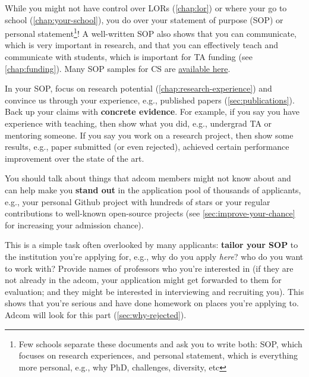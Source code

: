 \documentclass[oneside,11pt,dvipsnames]{book}
\begin{document}
While you might not have control over LORs (\autoref{chap:lor}) or where your go to school (\autoref{chap:your-school}), you do over your
statement of purpose (SOP) or personal statement\footnote{Few schools separate these documents and ask you to write both: SOP, which focuses on research experiences, and personal statement, which is everything more personal, e.g., why PhD, challenges, diversity, etc}! A well-written SOP also shows that you can communicate, which is very important in research, and that you can effectively teach and communicate with students, which is important for TA funding (see \autoref{chap:funding}).  Many SOP samples for CS are \href{https://cs-sop.org/}{available here}.  


In your SOP, focus on research potential (\autoref{chap:research-experience}) and convince us through your experience, e.g., published papers (\autoref{sec:publications}). Back up your claims with \textbf{concrete evidence}. For example, if you say you have experience with teaching, then show what you did, e.g., undergrad TA or mentoring someone.  If you say you work on a research project, then show some results, e.g., paper submitted (or even rejected), achieved certain performance improvement over the state of the art. 


You should talk about things that adcom members might not know about and can help make you \textbf{stand out} in the application pool of thousands of applicants, e.g., your personal Github project with hundreds of stars or your regular contributions to well-known open-source projects (see \autoref{sec:improve-your-chance} for increasing your admission chance).


This is a simple task often overlooked by many applicants: \textbf{tailor your SOP} to the institution you're applying for,
e.g., why do you apply \emph{here}? who do you want to work with?
Provide names of professors who you're interested in (if they are not already in the adcom, your application might get forwarded to them for evaluation; and they might be interested in interviewing and recruiting you).
This shows that you're serious and have done homework on places you're applying to.
Adcom will look for this part (\autoref{sec:why-rejected}).
\end{document}
